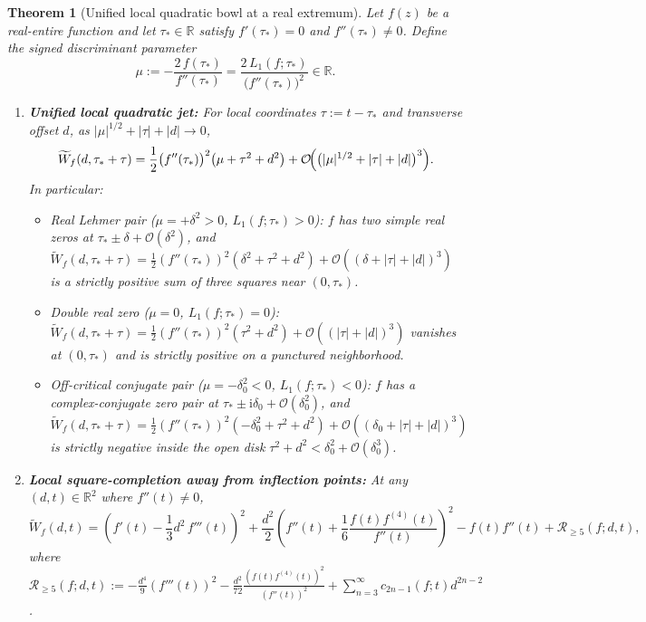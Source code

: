 \documentclass[11pt,reqno]{amsart}
\newtheorem{theorem}{Theorem}[section]
\theoremstyle{definition}
\theoremstyle{remark}
\numberwithin{equation}{section}
\newcommand{\ii}{\mathrm{i}}
\begin{document}
\begin{theorem}[Unified local quadratic bowl at a real extremum]\label{thm:lehmer_bowl}
Let $f(z)$ be a real-entire function and let $\tau_* \in \mathbb{R}$ satisfy $f'(\tau_*) = 0$ and $f''(\tau_*) \neq 0$. Define the signed discriminant parameter
\begin{equation}\label{eq:mu_def}
  \mu := -\frac{2\,f(\tau_*)}{f''(\tau_*)} = \frac{2\,L_1(f; \tau_*)}{\bigl(f''(\tau_*)\bigr)^2} \in \mathbb{R}.
\end{equation}
\begin{enumerate}[label=\textup{(\arabic*)},leftmargin=2.2em]
  \item \textbf{Unified local quadratic jet:} For local coordinates $\tau := t - \tau_*$ and transverse offset $d$, as $\lvert\mu\rvert^{1/2} + \lvert\tau\rvert + \lvert d\rvert \to 0$,
  \begin{equation}\label{eq:lehmer_bowl_unified}
    \widetilde{W}_f(d, \tau_* + \tau)
    = \frac{1}{2}\bigl(f''(\tau_*)\bigr)^2\bigl(\mu + \tau^2 + d^2\bigr)
      + \mathcal{O}\!\Bigl(\bigl(\lvert\mu\rvert^{1/2} + \lvert\tau\rvert + \lvert d\rvert\bigr)^3\Bigr).
  \end{equation}
  In particular:
  \begin{itemize}[leftmargin=1.6em]
    \item \emph{Real Lehmer pair ($\mu = +\delta^2 > 0$, $L_1(f;\tau_*) > 0$):} $f$ has two simple real zeros at $\tau_* \pm \delta + \mathcal{O}(\delta^2)$, and $\widetilde{W}_f(d, \tau_*+\tau) = \frac{1}{2}(f''(\tau_*))^2(\delta^2 + \tau^2 + d^2) + \mathcal{O}((\delta+|\tau|+|d|)^3)$ is a strictly positive sum of three squares near $(0, \tau_*)$.
    \item \emph{Double real zero ($\mu = 0$, $L_1(f;\tau_*) = 0$):} $\widetilde{W}_f(d,\tau_*+\tau) = \frac{1}{2}(f''(\tau_*))^2(\tau^2 + d^2) + \mathcal{O}((|\tau|+|d|)^3)$ vanishes at $(0,\tau_*)$ and is strictly positive on a punctured neighborhood.
    \item \emph{Off-critical conjugate pair ($\mu = -\delta_0^2 < 0$, $L_1(f;\tau_*) < 0$):} $f$ has a complex-conjugate zero pair at $\tau_* \pm \ii\delta_0 + \mathcal{O}(\delta_0^2)$, and $\widetilde{W}_f(d,\tau_*+\tau) = \frac{1}{2}(f''(\tau_*))^2(-\delta_0^2 + \tau^2 + d^2) + \mathcal{O}((\delta_0+|\tau|+|d|)^3)$ is \emph{strictly negative} inside the open disk $\tau^2 + d^2 < \delta_0^2 + \mathcal{O}(\delta_0^3)$.
  \end{itemize}
  \item \textbf{Local square-completion away from inflection points:} At any $(d,t) \in \mathbb{R}^2$ where $f''(t) \neq 0$,
  \begin{equation}\label{eq:global_three_square}
    \widetilde{W}_f(d,t)
    = \left(f'(t) - \frac{1}{3}d^2\,f'''(t)\right)^2
      + \frac{d^2}{2}\left(f''(t) + \frac{1}{6}\frac{f(t)f^{(4)}(t)}{f''(t)}\right)^2
      - f(t)f''(t) + \mathcal{R}_{\ge 5}(f; d,t),
  \end{equation}
  where $\mathcal{R}_{\ge 5}(f; d,t) := -\frac{d^4}{9}(f'''(t))^2 - \frac{d^2}{72}\frac{(f(t)f^{(4)}(t))^2}{(f''(t))^2} + \sum_{n=3}^\infty c_{2n-1}(f;t)d^{2n-2}$.
\end{enumerate}
\end{theorem}
\end{document}
